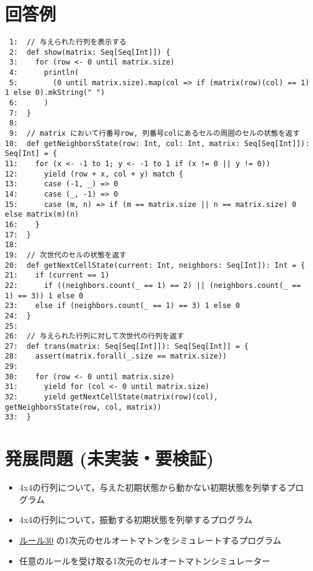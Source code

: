 \documentclass[a4j]{article}
\begin{document}
\section*{回答例}
\label{sec-4}


\begin{verbatim}
 1:  // 与えられた行列を表示する
 2:  def show(matrix: Seq[Seq[Int]]) {
 3:    for (row <- 0 until matrix.size)
 4:      println(
 5:        (0 until matrix.size).map(col => if (matrix(row)(col) == 1) 1 else 0).mkString(" ")
 6:      )
 7:  }
 8:  
 9:  // matrix において行番号row, 列番号colにあるセルの周囲のセルの状態を返す
10:  def getNeighborsState(row: Int, col: Int, matrix: Seq[Seq[Int]]): Seq[Int] = {
11:    for (x <- -1 to 1; y <- -1 to 1 if (x != 0 || y != 0))
12:      yield (row + x, col + y) match {
13:      case (-1, _) => 0
14:      case (_, -1) => 0
15:      case (m, n) => if (m == matrix.size || n == matrix.size) 0 else matrix(m)(n)
16:    }
17:  }
18:  
19:  // 次世代のセルの状態を返す
20:  def getNextCellState(current: Int, neighbors: Seq[Int]): Int = {
21:    if (current == 1)
22:      if ((neighbors.count(_ == 1) == 2) || (neighbors.count(_ == 1) == 3)) 1 else 0
23:    else if (neighbors.count(_ == 1) == 3) 1 else 0
24:  }
25:  
26:  // 与えられた行列に対して次世代の行列を返す
27:  def trans(matrix: Seq[Seq[Int]]): Seq[Seq[Int]] = {
28:    assert(matrix.forall(_.size == matrix.size))
29:  
30:    for (row <- 0 until matrix.size)
31:      yield for (col <- 0 until matrix.size)
32:      yield getNextCellState(matrix(row)(col), getNeighborsState(row, col, matrix))
33:  }
\end{verbatim}
\section*{発展問題 (未実装・要検証)}
\label{sec-5}
\begin{itemize}

\item 4x4の行列について，与えた初期状態から動かない初期状態を列挙するプログラム
\label{sec-5-1}%

\item 4x4の行列について，振動する初期状態を列挙するプログラム
\label{sec-5-2}%

\item \href{http://en.wikipedia.org/wiki/Rule_30}{ルール30} の1次元のセルオートマトンをシミュレートするプログラム
\label{sec-5-3}%

\item 任意のルールを受け取る1次元のセルオートマトンシミュレーター
\label{sec-5-4}%
\end{itemize} %
\end{document}
